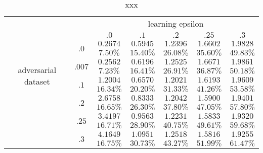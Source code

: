 		\begin{table}[h]
		\centering
		        \begin{tabular}{cc||ccccc}

		        	& &  \multicolumn{5}{c}{learning epsilon} \\
		        	& &  $.0$ & $.1$ & $.2$ & $.25$ & $.3$ \\
		            \hline \hline
		            \multirow{8}{*}{adversarial dataset} 
		            	& \multirow{2}{*}{$.0$}  &$0.2674	$&$0.5945	$&$1.2396	$&$1.6602	$&$1.9828	$   \\ 
		            	&                        &$7.50\%	$&$15.40\%	$&$26.08\%	$&$35.60\%	$&$49.83\%	$   \\ \cline{2-7} 
		            	& \multirow{2}{*}{$.007$}&$0.2562	$&$0.6196	$&$1.2525	$&$1.6671	$&$1.9861	$   \\ 
		            	&                        &$7.23\%	$&$16.41\%	$&$26.91\%	$&$36.87\%	$&$50.18\%	$   \\ \cline{2-7} 
		            	& \multirow{2}{*}{$.1$}  &$1.2004	$&$0.6570	$&$1.2021	$&$1.6193	$&$1.9609	$   \\
		            	&                        &$16.34\%	$&$20.20\%	$&$31.33\%	$&$41.26\%	$&$53.58\%	$   \\ \cline{2-7}
		                & \multirow{2}{*}{$.2$}  &$2.6758	$&$0.8333	$&$1.2042	$&$1.5900	$&$1.9401	$   \\
		                &                        &$16.65\%	$&$26.30\%	$&$37.80\%	$&$47.05\%	$&$57.80\%	$   \\ \cline{2-7}
		                & \multirow{2}{*}{$.25$} &$3.4197	$&$0.9563	$&$1.2231	$&$1.5833	$&$1.9320	$   \\
		                &                        &$16.71\%	$&$28.90\%	$&$40.75\%	$&$49.61\%	$&$59.68\%	$   \\ \cline{2-7}
		                & \multirow{2}{*}{$.3$}  &$4.1649	$&$1.0951	$&$1.2518	$&$1.5816	$&$1.9255	$   \\
		                &                        &$16.75\%	$&$30.73\%	$&$43.27\%	$&$51.99\%	$&$61.47\%	$   \\

		            
		        \end{tabular}
		    \caption{xxx}
		    \label{tab:xxx}
		\end{table}


